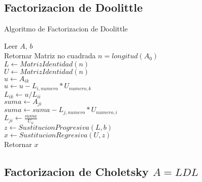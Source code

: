\documentclass[12pt]{article}
\begin{document}
        \subsection{Factorizacion de Doolittle}
        
        \begin{algorithm}[H]
            \caption{Algoritmo de Factorizacion de Doolittle}
            Leer $A$, $b$\\
            {
                Retornar Matriz no cuadrada
            }
            {
                $n = longitud(A_{0})$\\ 
                $L \leftarrow MatrizIdentidad(n)$\\
                $U \leftarrow MatrizIdentidad(n)$\\
                {
                    {
                        $u \leftarrow A_{ik}$\\
                        {
                            $u \leftarrow u - L_{i, numero} * U_{numero, k}$\\
                        }
                        $L_{ik} \leftarrow u/L_{ii}$\\
                    }
                    {
                        $suma \leftarrow A_{ji}$\\
                        {
                            $suma \leftarrow suma - L_{j, numero} * U_{numero, i}$\\
                        }
                        $L_{ji} \leftarrow \frac{suma}{U_{ii}}$\\
                    }
                }
                $z \leftarrow SustitucionProgresiva(L, b)$\\
                $x \leftarrow SustitucionRegresiva(U, z)$\\
                Retornar $x$
            }


            
        \end{algorithm}

        \subsection{Factorizacion de Choletsky $A = LDL$}
        
\end{document}
